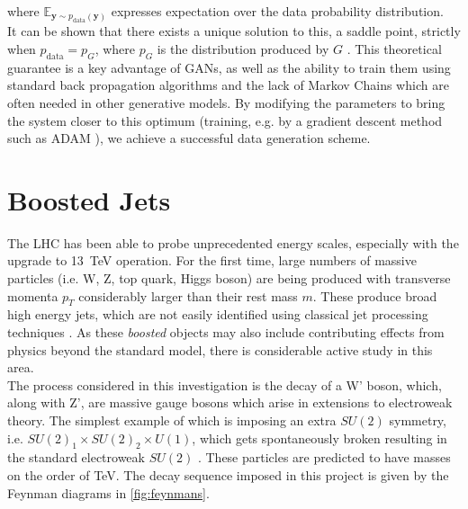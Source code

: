 \documentclass{report}
\begin{document}
where  $\mathbb{E}_{\mathbf{y}\sim p_{\text{data}}(\mathbf{y})}$ expresses expectation over the data probability distribution.  \\

It can be shown that there exists a unique solution to this, a saddle point, strictly when $p_{\text{data}} = p_G$, where $p_G$ is the distribution produced by $G$ \cite{gan1}. This theoretical guarantee is a key advantage of GANs, as well as the ability to train them using standard back propagation algorithms and the lack of Markov Chains which are often needed in other generative models. By modifying the parameters to bring the system closer to this optimum (training, e.g. by a gradient descent method such as ADAM \cite{adam}), we achieve a successful data generation scheme.    

\section{Boosted Jets}

The LHC has been able to probe unprecedented energy scales, especially with the upgrade to \SI{13}{\tera\electronvolt} operation. For the first time, large numbers of massive particles (i.e. W, Z, top quark, Higgs boson) are being produced with transverse momenta $p_T$ considerably larger than their rest mass $m$. These produce broad high energy jets, which are not easily identified using classical jet processing techniques \cite{BOOST}. As these \textit{boosted} objects may also include contributing effects from physics beyond the standard model, there is considerable active study in this area. \\ [MORE PHYSICS AND EQUATIONS]

The process considered in this investigation is the decay of a W' boson, which, along with Z', are massive gauge bosons which arise in extensions to electroweak theory. The simplest example of which is imposing an extra $SU(2)$ symmetry, i.e. $SU(2)_1 \times SU(2)_2 \times U(1)$, which gets spontaneously broken resulting in the standard electroweak $SU(2)$ \cite{pdg2012}. These particles are predicted to have masses on the order of \si{\tera\electronvolt}. The decay sequence imposed in this project is given by the Feynman diagrams in \cref{fig:feynmans}.
\end{document}
